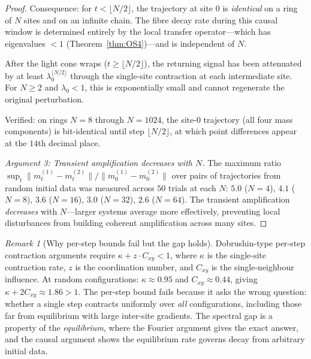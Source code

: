 \documentclass[11pt,a4paper]{article}
\theoremstyle{definition}
\theoremstyle{remark}
\newtheorem{remark}[theorem]{Remark}
\begin{document}
\begin{proof}
Consequence: for $t<\lfloor N/2\rfloor$, the trajectory at site $0$ is \emph{identical} on a ring of $N$ sites and on an infinite chain. The fibre decay rate during this causal window is determined entirely by the local transfer operator---which has eigenvalues $<1$ (Theorem~\ref{thm:OS4})---and is independent of $N$.

After the light cone wraps ($t\geq\lfloor N/2\rfloor$), the returning signal has been attenuated by at least $\lambda_0^{\lfloor N/2\rfloor}$ through the single-site contraction at each intermediate site. For $N\geq 2$ and $\lambda_0<1$, this is exponentially small and cannot regenerate the original perturbation.

Verified: on rings $N=8$ through $N=1024$, the site-$0$ trajectory (all four mass components) is bit-identical until step $\lfloor N/2\rfloor$, at which point differences appear at the $14$th decimal place.

\emph{Argument 3: Transient amplification decreases with $N$.} The maximum ratio $\sup_t\|m^{(1)}_t-m^{(2)}_t\|/\|m^{(1)}_0-m^{(2)}_0\|$ over pairs of trajectories from random initial data was measured across $50$ trials at each $N$: $5.0$ ($N\!=\!4$), $4.1$ ($N\!=\!8$), $3.6$ ($N\!=\!16$), $3.0$ ($N\!=\!32$), $2.6$ ($N\!=\!64$). The transient amplification \emph{decreases} with $N$---larger systems average more effectively, preventing local disturbances from building coherent amplification across many sites.
\end{proof}

\begin{remark}[Why per-step bounds fail but the gap holds]
Dobrushin-type per-step contraction arguments require $\kappa+z\cdot C_{xy}<1$, where $\kappa$ is the single-site contraction rate, $z$ is the coordination number, and $C_{xy}$ is the single-neighbour influence. At random configurations: $\kappa\approx 0.95$ and $C_{xy}\approx 0.44$, giving $\kappa+2C_{xy}\approx 1.86>1$. The per-step bound fails because it asks the wrong question: whether a single step contracts uniformly over \emph{all} configurations, including those far from equilibrium with large inter-site gradients. The spectral gap is a property of the \emph{equilibrium}, where the Fourier argument gives the exact answer, and the causal argument shows the equilibrium rate governs decay from arbitrary initial data.
\end{remark}
\end{document}
